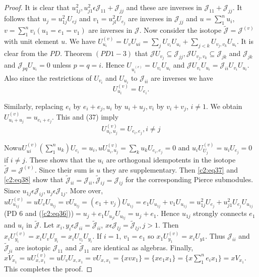 \begin{proof}
It is clear that $u^{2}_{1j},u^{2}_{j1}\epsilon
\mathscr{J}_{11}+\mathscr{J}_{jj}$ and these are inverses in
$\mathscr{J}_{11}+\mathscr{J}_{jj}$. It follows that
$u_j=u^{2}_{1j}U_{ej}$ and $v_{1}=u^{2}_{jl}U_{e_{j}}$ are inverses
in $\mathscr{J}_{jj}$ and $u=\sum\limits_{1}^{n}u_i$,
$v=\sum\limits_{1}^{n}v_i(u_1=e_1=v_1)$ are inverses in
$\mathscr{J}$. Now consider the isotope
$\widetilde{\mathscr{J}}=\mathscr{J}^{(v)}$ with unit element $u$. We
have $U_{u_{i}}^{(v)}=U_vU_{ui}=\sum_j
U_{v_{i}}U_{u_{i}}+\sum\limits_{j<k}U_{v_{j},v_{k}}U_{u_{i}}$. It is
clear from the $PD$. Theorem $(PD 1-3)$ that $\mathscr{J}
U_{v_{j}}\subseteq
\mathscr{J}_{jj},\mathscr{J}U_{v_{j},v_{k}}\subseteq\mathscr{J}_{jk}$
  and $\mathscr{J}_{jk}$ and $\mathscr{J}_{pq}U_{u_{i}}=0$ unless
  $p=q=i$. Hence $U_{u_{i}^{(v)}}=U_{v_{i}}U_{u_{i}}$ and
    $\mathscr{J}U_{v_{i}}U_{u_{i}}=\mathscr{J}_{ii}U_{v_{i}}U_{u_{i}}$. Also
    since the restrictions of $U_{v_{i}}$ and $U_{u_{i}}$ to
    $\mathscr{J}_{ii}$ are inverses we have
\begin{equation*}
U^{(v)}_{u_{i}}=U_{e_{i}}.\tag{37} \label{c2:eq37}
\end{equation*}

Similarly, replacing $e_i$ by $e_i+e_j, u_i$ by $u_i+u_j,v_i$ by
$v_i+v_j$, $i\neq 1$. We obtain
$U^{(v)}_{u_{i}+u_{j}}=u_{e_{i}+e_{j}}$. This and (37) imply
\begin{equation*}
  U^{(v)}_{u_{i},u_{j}}=U_{e_{i},e_{j}},i\neq j\tag{38}\label{c2:eq38}
\end{equation*}

Now\pageoriginale $uU_{ui}^{(v)}\left(\sum\limits_{1}^{n}u_k\right)
U_{e_{i}}=u_i,uU_{u_{i},u_{j}}^{(v)}=\sum\limits_{k}u_kU_{e_{i},e_{j}}=0$
and $u_i U^{(v)}_{U_{j}}=u_i U_{e_{j}}=0$ if $i\neq j$. These shows
that the $u_i$ are orthogonal idempotents in the isotope
$\widetilde{\mathscr{J}}=\mathscr{J}^{(v)}$. Since their sum is $u$
  they are supplementary. Then \eqref{c2:eq37} and \eqref{c2:eq38} show that
  $\widetilde{\mathscr{J}}_{ii}= \mathscr{J}_{ii},
  \widetilde{\mathscr{J}}_{ij} =\mathscr{J}_{ij}$ 
    for the corresponding Pierce submodules. Since $u_{1j}\epsilon 
    \mathscr{J}_{ij}, u_j\epsilon \mathscr{J}_{1j}$. More over,
    $uU^{(v)}_{u_{1j}}=uU_vU_{u_{lj}}=vU_{u_{lj}}=(e_1+ v_j)
    U_{u_{1j}}=e_1U_{u_{1j}} + v_1U_{u_{1j}}=u^{2}_{1j}U_{e_{j}}+u^{2}
    _ {j1}U_{e_{j}}U_{u_{1j}}$
    (PD 6 and (\eqref{c2:eq36}))$=u_j+e_1 U_{u_{jl}}U_{u_{lj}}=u_j+e_1$. Hence
    $u_{1j}$ strongly connects $e_1$ and $u_i$ in
    $\widetilde{\mathscr{J}}$. Let $x_i,y_i\epsilon
    \mathscr{J}_{ii}=\widetilde{\mathscr{J}}_{ii}$, $x\epsilon
    \mathscr{J}_{lj}=\widetilde{\mathscr{J}}_{lj}, j>1$. Then
    $x_iU^{(v)}_{y_i}=x_iU_vU_{y_{i}}=x_iU_{v_{i}}U_{y_{i}}$. If $i=1$,
    $v_1=e_1$ so $x_1U_{y_{1}}^{(v)} = x_i U_{y1}$. Thus
    $\mathscr{J}_{ii}$ and $\widetilde{\mathscr{J}}_{ii}$ are isotopic
    $\mathscr{J}_{11}$ and $\widetilde{\mathscr{J}}_{11}$ are
    identical as algebras. Finally, $x\widetilde{V}_{x_1}=u
    U_{x,x_{1}}^{(v)}=uU_v U_{x,x_1}=
    vU_{x,x_1}=\{xvx_1\}=\{xe_1x_1\}=\{x\sum\limits_1^{n}e_i x_1\}=x
    V_{x_1}$. This completes the proof.
\end{proof}

